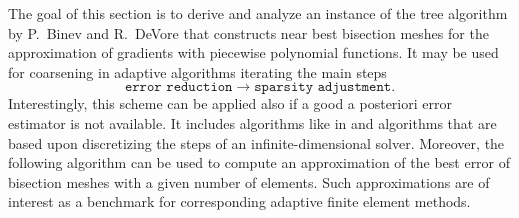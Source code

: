 \documentclass[a4paper]{amsart}
\numberwithin{equation}{section}
\theoremstyle{plain}
\theoremstyle{definition}
\begin{document}
The goal of this section is to derive and analyze an instance of the tree 
algorithm by P.~Binev and R.~DeVore \cite{Binev.DeVore:04} that constructs near 
best bisection meshes for the approximation of gradients with piecewise 
polynomial functions.  It may be used for coarsening in adaptive algorithms 
iterating the main steps
 \[
  \texttt{error reduction} \to \texttt{sparsity adjustment}.
 \]
Interestingly, this scheme can be applied also if a good a posteriori error 
estimator is not available.  It includes algorithms like in 
\cite[\S8]{Binev.Dahmen.DeVore:04} and algorithms that are based upon 
discretizing the steps of an infinite-dimensional solver.  Moreover, the 
following algorithm can be used to compute an approximation of the best error of 
bisection meshes with a given number of elements. Such approximations are of 
interest as a benchmark for corresponding adaptive finite element methods.
\end{document}
